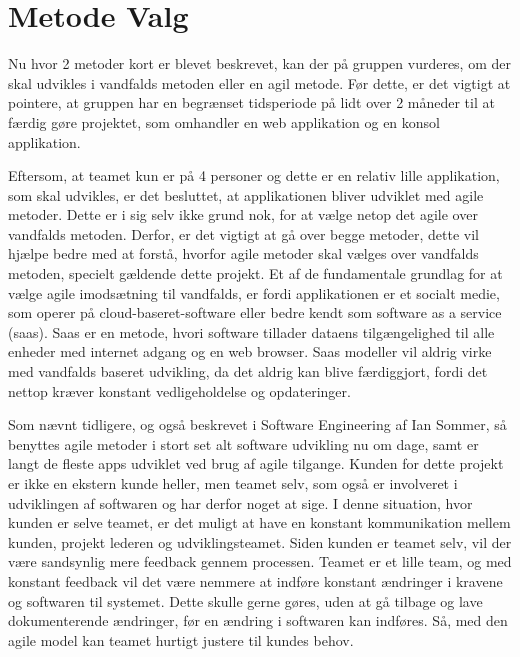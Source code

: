 \section{Metode Valg}

Nu hvor 2 metoder kort er blevet beskrevet, kan der på gruppen vurderes, om der skal udvikles i vandfalds metoden eller en agil metode. Før dette, er det vigtigt at pointere, at gruppen har en begrænset tidsperiode på lidt over 2 måneder til at færdig gøre projektet, som omhandler en web applikation og en konsol applikation. 

Eftersom, at teamet kun er på 4 personer og dette er en relativ lille applikation, som skal udvikles, er det besluttet, at applikationen bliver udviklet med agile metoder. Dette er i sig selv ikke grund nok, for at vælge netop det agile over vandfalds metoden. Derfor, er det vigtigt at gå over begge metoder, dette vil hjælpe bedre med at forstå, hvorfor agile metoder skal vælges over vandfalds metoden, specielt gældende dette projekt. Et af de fundamentale grundlag for at vælge agile imodsætning til vandfalds, er fordi applikationen er et socialt medie, som operer på cloud-baseret-software eller bedre kendt som software as a service (saas). Saas er en metode, hvori software tillader dataens tilgængelighed til alle enheder med internet adgang og en web browser.\cite{SoftwareAdvice} Saas modeller vil aldrig virke med vandfalds baseret udvikling, da det aldrig kan blive færdiggjort, fordi det nettop kræver konstant vedligeholdelse og opdateringer. 

Som nævnt tidligere, og også beskrevet i Software Engineering af Ian Sommer, så benyttes agile metoder i stort set alt software udvikling nu om dage, samt er langt de fleste apps udviklet ved brug af agile tilgange. \cite{Sommerville} Kunden for dette projekt er ikke en ekstern kunde heller, men teamet selv, som også er involveret i udviklingen af softwaren og har derfor noget at sige. I denne situation, hvor kunden er selve teamet, er det muligt at have en konstant kommunikation mellem kunden, projekt lederen og udviklingsteamet. Siden kunden er teamet selv, vil der være sandsynlig mere feedback gennem processen. Teamet er et lille team, og med konstant feedback vil det være nemmere at indføre konstant ændringer i kravene og softwaren til systemet. Dette skulle gerne gøres, uden at gå tilbage og lave dokumenterende ændringer, før en ændring i softwaren kan indføres. Så, med den agile model kan teamet hurtigt justere til kundes behov.  



